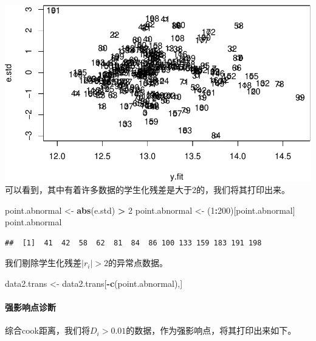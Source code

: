 \documentclass[]{article}
\newenvironment{Shaded}{\begin{snugshade}}{\end{snugshade}}
\newcommand{\KeywordTok}[1]{\textcolor[rgb]{0.13,0.29,0.53}{\textbf{#1}}}
\newcommand{\DecValTok}[1]{\textcolor[rgb]{0.00,0.00,0.81}{#1}}
\newcommand{\FloatTok}[1]{\textcolor[rgb]{0.00,0.00,0.81}{#1}}
\newcommand{\StringTok}[1]{\textcolor[rgb]{0.31,0.60,0.02}{#1}}
\newcommand{\OperatorTok}[1]{\textcolor[rgb]{0.81,0.36,0.00}{\textbf{#1}}}
\newcommand{\NormalTok}[1]{#1}
\let\oldparagraph\paragraph
\renewcommand{\paragraph}[1]{\oldparagraph{#1}\mbox{}}
\begin{document}
\includegraphics{FinalProjectForRegressionAnalysis_files/figure-latex/unnamed-chunk-13-1.pdf}
可以看到，其中有着许多数据的学生化残差是大于2的，我们将其打印出来。

\begin{Shaded}
\begin{Highlighting}[]
\NormalTok{point.abnormal <-}\StringTok{ }\KeywordTok{abs}\NormalTok{(e.std) }\OperatorTok{>}\StringTok{ }\DecValTok{2}
\NormalTok{point.abnormal <-}\StringTok{ }\NormalTok{(}\DecValTok{1}\OperatorTok{:}\DecValTok{200}\NormalTok{)[point.abnormal]}
\NormalTok{point.abnormal}
\end{Highlighting}
\end{Shaded}

\begin{verbatim}
##  [1]  41  42  58  62  81  84  86 100 133 159 183 191 198
\end{verbatim}

我们剔除学生化残差\(|r_i| > 2\)的异常点数据。

\begin{Shaded}
\begin{Highlighting}[]
\NormalTok{data2.trans <-}\StringTok{ }\NormalTok{data2.trans[}\OperatorTok{-}\KeywordTok{c}\NormalTok{(point.abnormal),]}
\end{Highlighting}
\end{Shaded}

\paragraph{强影响点诊断}

综合cook距离，我们将\(D_i > 0.01\)的数据，作为强影响点，将其打印出来如下。

\begin{Shaded}
\end{Shaded}
\end{document}
